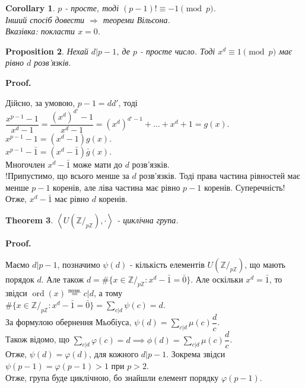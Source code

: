 \documentclass[a4paper, 14pt]{extarticle}
\makeatletter
\theoremstyle{theoremdd}
\newtheorem{theorem}{Theorem}[subsection]
\theoremstyle{theoremdd}
\theoremstyle{theoremdd}
\theoremstyle{theoremdd}
\theoremstyle{theoremdd}
\newtheorem{proposition}[theorem]{Proposition}
\theoremstyle{theoremdd}
\theoremstyle{theoremdd}
\theoremstyle{theoremdd}
\newtheorem{corollary}[theorem]{Corollary}
\def\qed{$\blacksquare$}
\def\rightproof{$\boxed{\Rightarrow}$ }
\renewenvironment{proof}[1][Proof.\\]{\par
\pushQED{\hfill \qed}%
\normalfont \topsep6\p@\@plus6\p@\relax
\trivlist
\item\relax
{\bfseries
#1\@addpunct{.}}\hspace\labelsep\ignorespaces
}{%
\popQED\endtrivlist\@endpefalse
}
\DeclareMathOperator{\ord}{ord}
\makeatother
\begin{document}
\begin{corollary}
$p$ - просте, тоді $(p-1)! \equiv - 1 \pmod p$.\\
\textit{Інший спосіб довести \rightproof теореми Вільсона.}\\
\textit{Вказівка: покласти $x = 0$.}
\end{corollary}

\begin{proposition}
Нехай $d | p-1$, де $p$ - просте число. Тоді $x^d \equiv 1 \pmod p$ має рівно $d$ розв'язків.
\end{proposition}

\begin{proof}
Дійсно, за умовою, $p-1 = dd'$, тоді\\
$\dfrac{x^{p-1}-1}{x^d-1} = \dfrac{(x^d)^{d'}-1}{x^d-1} = (x^d)^{d'-1} + \dots + x^d + 1 = g(x)$.\\
$x^{p-1}-1 = (x^d-1)g(x)$.\\
$x^{p-1}-\bar{1} = (x^d-\bar{1})\bar{g}(x)$.\\
Многочлен $x^d - \bar{1}$ може мати до $d$ розв'язків.\\
!Припустимо, що всього менше за $d$ розв'язків. Тоді права частина рівностей має менше $p-1$ коренів, але ліва частина має рівно $p-1$ коренів. Суперечність!\\
Отже, $x^d - \bar{1}$ має рівно $d$ коренів.
\end{proof}

\begin{theorem}
$\left<U(\mathbb{Z}/_{p\mathbb{Z}}), \cdot \right>$ - циклічна група.
\end{theorem}

\begin{proof}
Маємо $d|p-1$, позначимо $\psi(d)$ - кількість елементів $U(\mathbb{Z}/_{p\mathbb{Z}})$, що мають порядок $d$. Але також $d = \#\{ x \in \mathbb{Z}/_{p \mathbb{Z}}: x^d - \bar{1} = \bar{0} \}$. Але оскільки $x^d = \bar{1}$, то звідси $\ord (x) \overset{\text{позн.}}{=} c | d$, а тому\\
$\# \{x \in \mathbb{Z}/_{p \mathbb{Z}}: x^d - \bar{1} = \bar{0}\} = \displaystyle\sum_{c | d} \psi(c) = d$.\\
За формулою обернення Мьобіуса, $\displaystyle \psi(d) = \sum_{c | d} \mu(c) \dfrac{d}{c}$.\\
Також відомо, що $\displaystyle\sum_{c | d} \varphi(c) = d \implies \phi(d) = \sum_{ c | d} \mu(c) \dfrac{d}{c}$.\\
Отже, $\psi(d) = \varphi(d)$, для кожного $d | p-1$. Зокрема звідси $\psi(p-1) = \varphi(p-1) > 1$ при $p > 2$.\\
Отже, група буде циклічною, бо знайшли елемент порядку $\varphi(p-1)$.
\end{proof}
\end{document}
